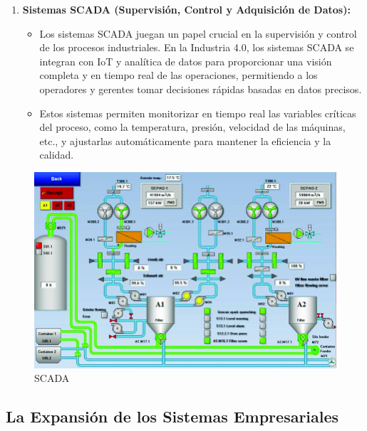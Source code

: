 \documentclass[
  letterpaper,
]{book}
\providecommand{\tightlist}{%
  \setlength{\itemsep}{0pt}\setlength{\parskip}{0pt}}\usepackage{longtable,booktabs,array}
\begin{document}
\begin{enumerate}
\def\labelenumi{\arabic{enumi}.}
\setcounter{enumi}{2}
\tightlist
\item
  \textbf{Sistemas SCADA (Supervisión, Control y Adquisición de Datos):}

  \begin{itemize}
  \tightlist
  \item
    Los sistemas SCADA juegan un papel crucial en la supervisión y
    control de los procesos industriales. En la Industria 4.0, los
    sistemas SCADA se integran con IoT y analítica de datos para
    proporcionar una visión completa y en tiempo real de las
    operaciones, permitiendo a los operadores y gerentes tomar
    decisiones rápidas basadas en datos precisos.
  \item
    Estos sistemas permiten monitorizar en tiempo real las variables
    críticas del proceso, como la temperatura, presión, velocidad de las
    máquinas, etc., y ajustarlas automáticamente para mantener la
    eficiencia y la calidad.
  \end{itemize}
\end{enumerate}

\begin{figure}[H]

{\centering \includegraphics{Img/scada.png}

}

\caption{SCADA}

\end{figure}%

\subsection{La Expansión de los Sistemas
Empresariales}\label{la-expansiuxf3n-de-los-sistemas-empresariales}
\end{document}
